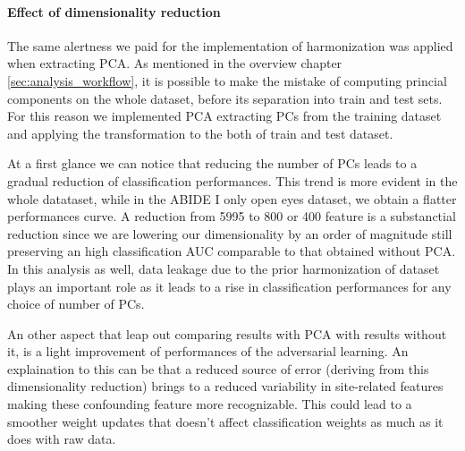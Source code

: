 \documentclass[11pt]{report}
\begin{document}


\paragraph{Effect of dimensionality reduction}
The same alertness we paid for the implementation of harmonization was applied when extracting PCA. As mentioned in the overview chapter \ref{sec:analysis_workflow}, it is possible to make the mistake of computing princial components on the whole dataset, before its separation into train and test sets.
For this reason we implemented PCA extracting PCs from the training dataset and applying the transformation to the both of train and test dataset.
\hfill

At a first glance we can notice that reducing the number of PCs leads to a gradual reduction of classification performances.
This trend is more evident in the whole datataset, while in the ABIDE I only open eyes dataset, we obtain a flatter performances curve.
A reduction from 5995 to 800 or 400 feature is a substanctial reduction since we are lowering our dimensionality by an order of magnitude still preserving an high classification AUC comparable to that obtained without PCA.
In this analysis as well, data leakage due to the prior harmonization of dataset plays an important role as it leads to a rise in classification performances for any choice of number of PCs.

An other aspect that leap out comparing results with PCA with results without it, is a light improvement of performances of the adversarial learning.
An explaination to this can be that a reduced source of error (deriving from this dimensionality reduction) brings to a reduced variability in site-related features making these confounding feature more recognizable. This could lead to a smoother weight updates that doesn't affect classification weights as much as it does with raw data.
\end{document}
